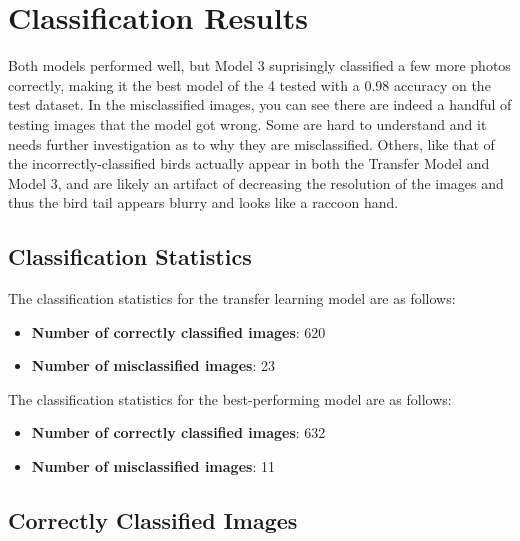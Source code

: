 \documentclass[a4paper,12pt]{article}
\begin{document}
\section{Classification Results}
Both models performed well, but Model 3 suprisingly classified a few more photos correctly, making it the best model of the 4 tested with a 0.98 accuracy on the test dataset. In the misclassified images, you can see there are indeed a handful of testing images that the model got wrong. Some are hard to understand and it needs further investigation as to why they are misclassified. Others, like that of the incorrectly-classified birds actually appear in both the Transfer Model and Model 3, and are likely an artifact of decreasing the resolution of the images and thus the bird tail appears blurry and looks like a raccoon hand. 


\subsection{Classification Statistics}
The classification statistics for the transfer learning model are as follows:
\begin{itemize}
    \item \textbf{Number of correctly classified images}: 620
    \item \textbf{Number of misclassified images}: 23
\end{itemize}

The classification statistics for the best-performing model are as follows:
\begin{itemize}
    \item \textbf{Number of correctly classified images}: 632
    \item \textbf{Number of misclassified images}: 11
\end{itemize}


\subsection{Correctly Classified Images}
\end{document}
